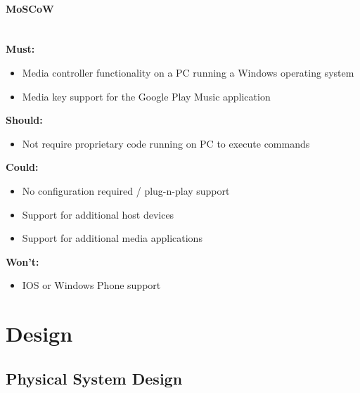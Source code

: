 \documentclass{article}
\begin{document}
			\paragraph{MoSCoW}\label{MoSCoW}
				\noindent\\
				\textbf{Must:}
					\begin{itemize}
						\item Media controller functionality on a PC running a Windows operating system
						\item Media key support for the Google Play Music application
					\end{itemize}			
				\textbf{Should:}
					\begin{itemize}
						\item Not require proprietary code running on PC to execute commands
					\end{itemize}
				\textbf{Could:}
					\begin{itemize}
						\item No configuration required / plug-n-play support
						\item Support for additional host devices
						\item Support for additional media applications
					\end{itemize}
				\textbf{Won't:}
					\begin{itemize}
						\item IOS or Windows Phone support
					\end{itemize}
			


	
	\section{Design}
		\subsection{Physical System Design}
			\lipsum[1]
			
\end{document}
